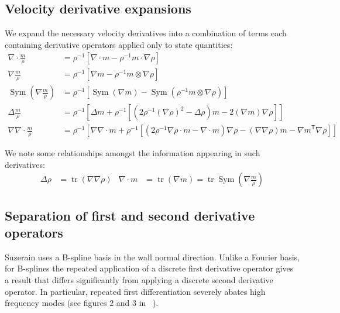 \documentclass[letterpaper,11pt,nointlimits,reqno]{amsart}
\newcommand{\trans}[1]{{#1}^{\ensuremath{\mathsf{T}}}}
\newcommand{\symmetricpart}[1]
  {\ensuremath{\operatorname{Sym}\left(#1\right)}}
\DeclareMathOperator{\trace}{tr}
\begin{document}
\subsection{Velocity derivative expansions}
\label{velocity_derivative_expansions}

We expand the necessary velocity derivatives into a combination of terms each
containing derivative operators applied only to state quantities:
\begin{subequations}
\begin{align}
  \nabla\cdot\frac{m}{\rho}
  &=
  \rho^{-1}\left[ \nabla\cdot{}m - \rho^{-1}m\cdot\nabla\rho \right]
\\
  \nabla{}\frac{m}{\rho}
  &=
  \rho^{-1}\left[ \nabla{}m - \rho^{-1}{m}\otimes\nabla\rho  \right]
\\
  \symmetricpart{\nabla\frac{m}{\rho}}
  &=
  \rho^{-1}\left[
      \symmetricpart{\nabla{}m}
    - \symmetricpart{\rho^{-1}m\otimes\nabla\rho}
  \right]
\\
  \Delta\frac{m}{\rho}
  &=
 \rho^{-1}\left[
      \Delta{}m
    + \rho^{-1}\left[
          \left(
              2\rho^{-1}\left(\nabla\rho\right)^{2}
            - \Delta\rho
          \right) {m}
        - 2 \left(\nabla{}m\right)\nabla\rho
      \right]
 \right]
\\
  \nabla\nabla\cdot\frac{m}{\rho}
  &=
  \rho^{-1}\left[
        \nabla\nabla\cdot{}m
      + \rho^{-1}\left[
            \left(2\rho^{-1}\nabla\rho\cdot{}m-\nabla\cdot{}m\right)\nabla\rho
          - \left(\nabla\nabla\rho\right)m
          - \trans{\nabla{}m}\nabla\rho
        \right]
  \right]
\end{align}
\end{subequations}

We note some relationships amongst the information appearing in such
derivatives:
\begin{align}
  \Delta\rho
  &=
  \trace\left( \nabla\nabla\rho \right)
&
  \nabla\cdot{}m
  &=
  \trace\left(\nabla{}m\right)
  =
  \trace\symmetricpart{\nabla\frac{m}{\rho}}
\end{align}

\subsection{Separation of first and second derivative operators}
\label{separate_first_section_deriv}

Suzerain uses a B-spline basis in the wall normal direction.  Unlike a Fourier
basis, for B-splines the repeated application of a discrete first derivative
operator gives a result that differs significantly from applying a discrete
second derivative operator.  In particular, repeated first differentiation
severely abates high frequency modes (see figures 2 and 3 in ~\cite{Kwok2001}).
\end{document}
